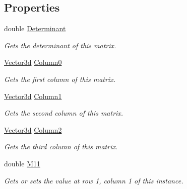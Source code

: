 \subsection*{Properties}
\begin{DoxyCompactItemize}
\item 
double \hyperlink{struct_open_t_k_1_1_matrix3d_af2084cf120a96d19e0c7c11489d05319}{Determinant}
\begin{DoxyCompactList}\small\item\em Gets the determinant of this matrix. \end{DoxyCompactList}\item 
\hyperlink{struct_open_t_k_1_1_vector3d}{Vector3d} \hyperlink{struct_open_t_k_1_1_matrix3d_a365bc1ca87efb0a417454fc664df508f}{Column0}
\begin{DoxyCompactList}\small\item\em Gets the first column of this matrix. \end{DoxyCompactList}\item 
\hyperlink{struct_open_t_k_1_1_vector3d}{Vector3d} \hyperlink{struct_open_t_k_1_1_matrix3d_a73eb828837ef981008c7a7c886f0ab61}{Column1}
\begin{DoxyCompactList}\small\item\em Gets the second column of this matrix. \end{DoxyCompactList}\item 
\hyperlink{struct_open_t_k_1_1_vector3d}{Vector3d} \hyperlink{struct_open_t_k_1_1_matrix3d_af2d083453b62ace565ce14add3aa2365}{Column2}
\begin{DoxyCompactList}\small\item\em Gets the third column of this matrix. \end{DoxyCompactList}\item 
double \hyperlink{struct_open_t_k_1_1_matrix3d_a460d6523f6ff700fcd5c6384ed0823c9}{M11}
\begin{DoxyCompactList}\small\item\em Gets or sets the value at row 1, column 1 of this instance. \end{DoxyCompactList}\item 

\end{DoxyCompactItemize}
